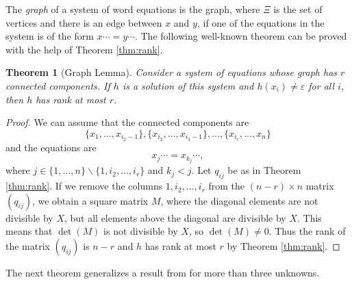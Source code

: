 \documentclass[submission]{eptcs}
\newtheorem{theorem}{Theorem}[section]
\theoremstyle{definition}
\newcommand{\eps}{\varepsilon}
\newcommand{\dd}{\cdots}
\begin{document}
The \emph{graph} of a system of word equations is the graph, where
$\Xi$ is the set of vertices and there is an edge between $x$ and
$y$, if one of the equations in the system is of the form $x \dd = y
\dd$. The following well-known theorem can be proved with the help
of Theorem \ref{thm:rank}.

\begin{theorem}[Graph Lemma] \label{thm:graph}
Consider a system of equations whose graph has $r$ connected
components. If $h$ is a solution of this system and $h(x_i) \ne
\eps$ for all $i$, then $h$ has rank at most $r$.
\end{theorem}
\begin{proof}
We can assume that the connected components are
\begin{equation*}
    \{x_1, \dots, x_{i_2-1}\},
    \{x_{i_2}, \dots, x_{i_3-1}\},
    \dots,
    \{x_{i_r}, \dots, x_n\}
\end{equation*}
and the equations are
\begin{equation*}
    x_j \dd = x_{k_j} \dd,
\end{equation*}
where $j \in \{1, \dots, n\} \smallsetminus \{1, i_2, \dots, i_r\}$
and $k_j < j$. Let $q_{ij}$ be as in Theorem \ref{thm:rank}. If we
remove the columns $1, i_2, \dots, i_r$ from the $(n-r) \times n$
matrix $(q_{ij})$, we obtain a square matrix $M$, where the diagonal
elements are not divisible by $X$, but all elements above the
diagonal are divisible by $X$. This means that $\det(M)$ is not
divisible by $X$, so $\det(M) \ne 0$. Thus the rank of the matrix
$(q_{ij})$ is $n-r$ and $h$ has rank at most $r$ by Theorem
\ref{thm:rank}.
\end{proof}

The next theorem generalizes a result from \cite{CzKa07} for more
than three unknowns.
\end{document}
